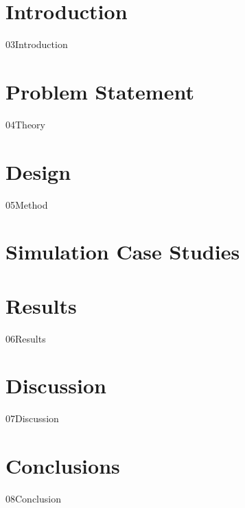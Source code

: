 \documentclass[a4paper, 12pt]{report}
\begin{document}

\chapter{Introduction}
{03Introduction}


\chapter{Problem Statement}
{04Theory}

\chapter{Design}
{05Method}

\chapter{Simulation Case Studies}

\chapter{Results}
{06Results}


\chapter{Discussion}
{07Discussion}


\chapter{Conclusions}
{08Conclusion}

\newpage
{}



\fancyhf{} %
\renewcommand{\headrulewidth}{0pt} %
\fancyfoot[C]{\thepage} %

%
\end{document}
